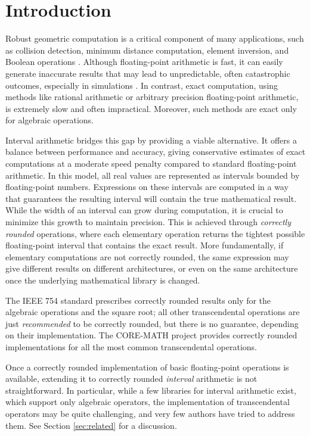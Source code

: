 
\section{Introduction}
\label{sec:introduction}
Robust geometric computation is a critical component of many applications, such as collision detection, minimum distance computation, element inversion, and Boolean operations \cite{something}. Although floating-point arithmetic is fast, it can easily generate inaccurate results that may lead to unpredictable, often catastrophic outcomes, especially in simulations \cite{something}. In contrast, exact computation, using methods like rational arithmetic or arbitrary precision floating-point arithmetic, is extremely slow and often impractical.
Moreover, such methods are exact only for algebraic operations. 

Interval arithmetic bridges this gap by providing a viable alternative. 
It offers a balance between performance and accuracy, giving conservative estimates of exact computations at a moderate speed penalty compared to standard floating-point arithmetic. In this model, all real values are represented as intervals bounded by floating-point numbers. Expressions on these intervals are computed in a way that guarantees the resulting interval will contain the true mathematical result.
While the width of an interval can grow during computation, it is crucial to minimize this growth to maintain precision. This is achieved through \emph{correctly rounded} operations, where each elementary operation returns the tightest possible floating-point interval that contains the exact result.
More fundamentally, if elementary computations are not correctly rounded, the same expression %
 may give different results on different architectures, or even on the same architecture once the underlying mathematical library is changed. 

The IEEE 754 standard prescribes correctly rounded results only for the algebraic operations and the square root; all other transcendental operations are just \emph{recommended} to be correctly rounded, but there is no guarantee, depending on their implementation.
The CORE-MATH project \cite{core-math} provides correctly rounded implementations for all the most common transcendental operations. 

Once a correctly rounded implementation of basic floating-point operations is available, extending it to correctly rounded \emph{interval} arithmetic is not straightforward. 
In particular, while a few libraries for interval arithmetic exist, which support only algebraic operators, the implementation of transcendental operators may be quite challenging, and very few authors have tried to address them. 
See Section \ref{sec:related} for a discussion. 

